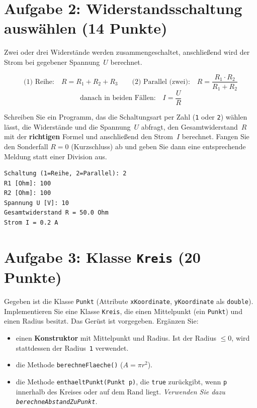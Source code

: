 \documentclass[
	fontsize=12pt,
	paper=a4,
	numbers=noenddot,
	parskip=half,
	openany
]{scrbook}
\begin{document}
\clearpage
\section*{Aufgabe 2: Widerstandsschaltung auswählen \hfill (14 Punkte)}

Zwei oder drei Widerstände werden zusammengeschaltet, anschließend wird der Strom bei gegebener Spannung~$U$ berechnet.

\begin{formeln}
\[
	\text{(1) Reihe:}\quad R = R_1 + R_2 + R_3
	\qquad
	\text{(2) Parallel (zwei):}\quad R = \frac{R_1 \cdot R_2}{R_1 + R_2}
\]
\[
	\text{danach in beiden Fällen:}\quad I = \frac{U}{R}
\]
\end{formeln}

Schreiben Sie ein Programm, das die Schaltungsart per Zahl (\texttt{1} oder \texttt{2}) wählen lässt, die Widerstände und die Spannung~$U$ abfragt, den Gesamtwiderstand~$R$ mit der \textbf{richtigen} Formel und anschließend den Strom~$I$ berechnet. Fangen Sie den Sonderfall $R = 0$ (Kurzschluss) ab und geben Sie dann eine entsprechende Meldung statt einer Division aus.

\begin{beispiel}[Beispieldialog]
\begin{lstlisting}[language={}]
Schaltung (1=Reihe, 2=Parallel): 2
R1 [Ohm]: 100
R2 [Ohm]: 100
Spannung U [V]: 10
Gesamtwiderstand R = 50.0 Ohm
Strom I = 0.2 A
\end{lstlisting}
\end{beispiel}

\clearpage
\section*{Aufgabe 3: Klasse \texttt{Kreis} \hfill (20 Punkte)}

Gegeben ist die Klasse \texttt{Punkt} (Attribute \texttt{xKoordinate}, \texttt{yKoordinate} als \texttt{double}).
Implementieren Sie eine Klasse \texttt{Kreis}, die einen Mittelpunkt (ein \texttt{Punkt}) und einen Radius besitzt.
Das Gerüst ist vorgegeben. Ergänzen Sie:

\begin{itemize}[nosep]
	\item einen \textbf{Konstruktor} mit Mittelpunkt und Radius. Ist der Radius $\le 0$, wird stattdessen der Radius~\texttt{1} verwendet.
	\item die Methode \texttt{berechneFlaeche()} ($A = \pi r^2$).
	\item die Methode \texttt{enthaeltPunkt(Punkt p)}, die \texttt{true} zurückgibt, wenn \texttt{p} innerhalb des Kreises oder auf dem Rand liegt. \emph{Verwenden Sie dazu \texttt{berechneAbstandZuPunkt}.}
\end{itemize}
\end{document}
